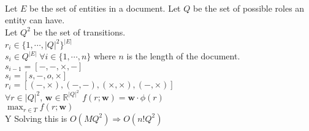 \documentclass{article}
\newcommand{\entities}{E}
\newcommand{\roles}{Q}
\newcommand{\Tv}{T}
\newcommand{\sent}{s}
\newcommand{\weight}{\mathbf{w}}
\newcommand{\trans}{r}
\begin{document}
\\
\\
\\
Let $\entities$ be the set of entities in a document.
Let $\roles$ be the set of possible roles an entity can have.\\
Let $\roles^2$ be the set of transitions.\\
$\trans_i \in \{1,\cdots, |\roles|^2\}^{|\entities|}$\\
$\sent_i \in \roles^{|\entities|}\;\forall i \in \{1,\cdots, n\}$ where $n$ is the length of the document.\\
$\sent_{i-1} = [-,-,\times,-]$\\ 
$\sent_{i} = [s,-,o,\times]$\\
$\trans_i = [(-,\times),(-,-),(\times,\times),(-,\times)]$\\ 
$\forall r \in |\roles|^2$, 
$\weight \in \mathbb{R}^{|\roles|^2}$
$f(\trans;\weight) = \weight \cdot \phi(\trans)$\\
$\max_{\trans \in \Tv} f(\trans ; \weight )$\\Y
Solving this is $O(M\roles^2) \Rightarrow O(n!\roles^2)$
\end{document}
